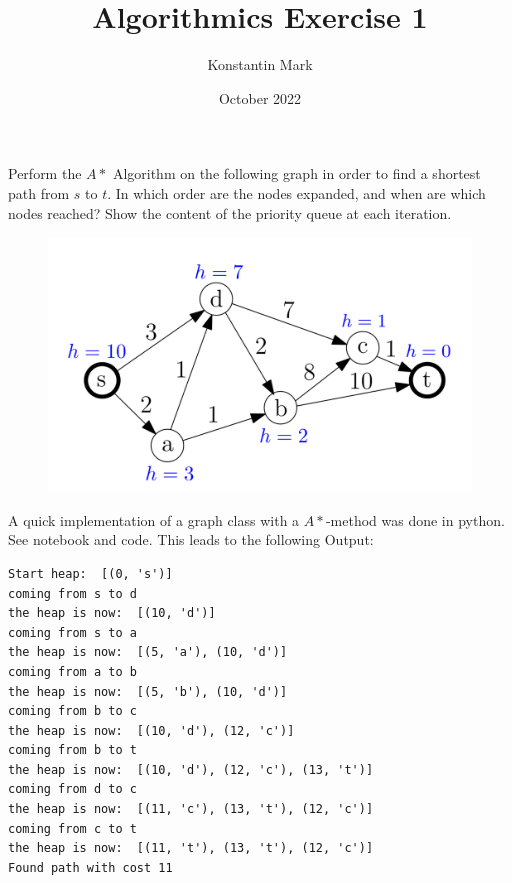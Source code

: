 \documentclass{article}
\title{Algorithmics Exercise 1}
\author{Konstantin Mark}
\date{October 2022}
\begin{document}
\maketitle

\begin{exercise}[$A*$ Algorithm]
    Perform the $A*$ Algorithm on the following graph in order to find a shortest path from $s$ to $t$. In which order are the nodes expanded, and when are which nodes reached? Show the content of the priority queue at each iteration.

\begin{figure}[H]
    \centering
    \includegraphics[scale=0.3]{1/exercise/ex1graph.png}
    
    \label{fig:ex1graph.png}
\end{figure}


\end{exercise}
\begin{solving}
    A quick implementation of a graph class with a $A*$-method was done in python. See notebook and code. This leads to the following Output:
    \begin{verbatim}
Start heap:  [(0, 's')]
coming from s to d
the heap is now:  [(10, 'd')]
coming from s to a
the heap is now:  [(5, 'a'), (10, 'd')]
coming from a to b
the heap is now:  [(5, 'b'), (10, 'd')]
coming from b to c
the heap is now:  [(10, 'd'), (12, 'c')]
coming from b to t
the heap is now:  [(10, 'd'), (12, 'c'), (13, 't')]
coming from d to c
the heap is now:  [(11, 'c'), (13, 't'), (12, 'c')]
coming from c to t
the heap is now:  [(11, 't'), (13, 't'), (12, 'c')]
Found path with cost 11
\end{verbatim}
\end{solving}
\newpage
\end{document}
